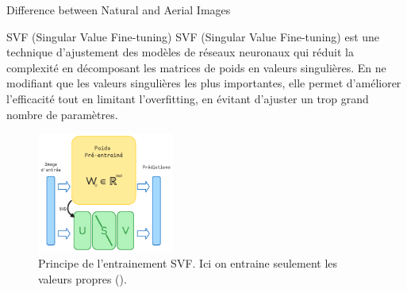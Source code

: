 \begin{subsectionframemod}{Difference between Natural and Aerial Images}
    \begin{alertblock}{SVF (Singular Value Fine-tuning)}
        SVF (Singular Value Fine-tuning) est une technique d'ajustement des modèles de réseaux neuronaux qui réduit la complexité en décomposant les matrices de poids en valeurs singulières.
        En ne modifiant que les valeurs singulières les plus importantes, elle permet d'améliorer l'efficacité tout en limitant l'overfitting, en évitant d'ajuster un trop grand nombre de paramètres.
    \end{alertblock}
    \vspace{5mm}

    \begin{figure}
        \includegraphics[width=0.4\textwidth]{Figures/svf.png}
        \caption{Principe de l'entrainement SVF. Ici on entraine seulement les valeurs propres (\cite{lora}).}
    \end{figure}


\end{subsectionframemod}